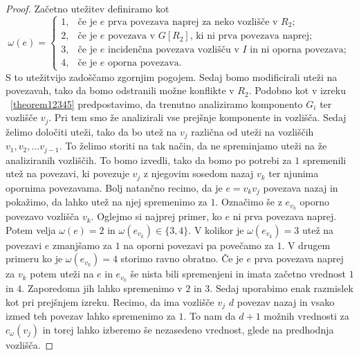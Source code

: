 \documentclass[12pt,a4paper,twoside]{article}
\theoremstyle{definition} %
\theoremstyle{plain} %
\numberwithin{equation}{section}  %
\begin{document}
\begin{proof}
Začetno utežitev definiramo kot
$$ \omega(e) =\begin{cases}
	1 ,&\text{če je $e$ prva povezava naprej za neko vozlišče v } R_2;\\ 
	2, &  \text{če je $e$ povezava v $G[R_2]$, ki ni prva povezava naprej}; \\
	3 ,& \text{če je $e$ incidenčna povezava vozlišču v $I$ in ni oporna povezava}; \\
4, & \text{če je $e$ oporna povezava.} 
	\end{cases}
$$
S to utežitvijo zadoščamo zgornjim pogojem. Sedaj bomo modificirali uteži na povezavah, tako da bomo odstranili možne konflikte v $R_2$. Podobno kot v izreku ~\ref{theorem12345} predpostavimo, da trenutno analiziramo komponento $G_i$ ter vozlišče $v_j$. Pri tem smo že analizirali vse prejšnje komponente in vozlišča. Sedaj želimo določiti uteži, tako da bo utež na $v_j$ različna od uteži na vozliščih $v_1, v_2, \ldots v_{j-1}$. To želimo storiti na tak način, da ne spreminjamo uteži na že analiziranih vozliščih. To bomo izvedli, tako da bomo po potrebi za $1$ spremenili utež na povezavi, ki povezuje $v_j$ z njegovim sosedom nazaj $v_k$ ter njunima opornima povezavama. Bolj natančno recimo, da je $e = v_kv_j$ povezava nazaj in pokažimo, da lahko utež na njej spremenimo za $1$. Označimo še z $e_{v_k}$ oporno povezavo vozlišča $v_k$. Oglejmo si najprej primer, ko $e$ ni prva povezava naprej. Potem velja $\omega(e) = 2$ in $\omega(e_{v_k}) \in \{3, 4\}$. V kolikor je $\omega(e_{v_k}) = 3$ utež na povezavi $e$ zmanjšamo za $1$ na oporni povezavi pa povečamo za $1$. V drugem primeru ko je $\omega(e_{v_k}) = 4$ storimo ravno obratno. Če je $e$ prva povezava naprej za $v_k$ potem uteži na $e$ in $e_{v_k}$ še nista bili spremenjeni in imata začetno vrednost $1$ in $4$. Zaporedoma jih lahko spremenimo v $2$ in $3$. Sedaj uporabimo enak razmislek kot pri prejšnjem izreku. Recimo, da ima vozlišče $v_j$ $d$ povezav nazaj in vsako izmed teh povezav lahko spremenimo za $1$. To nam da $d + 1$ možnih vrednosti za $c_{\omega}(v_j)$ in torej lahko izberemo še nezasedeno vrednost, glede na predhodnja vozlišča.


\end{proof}
\end{document}
